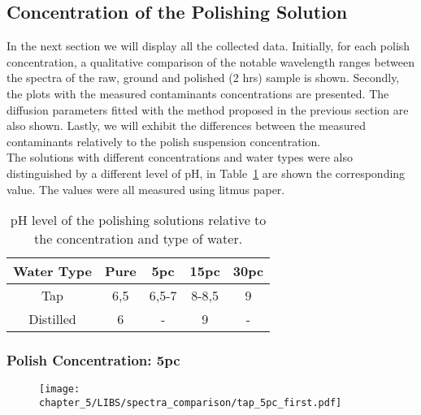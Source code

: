 \subsection{Concentration of the Polishing Solution}
\label{subsec:conc_results}
In the next section we will display all the collected data. Initially, for each polish concentration, a qualitative comparison of the notable wavelength ranges between the spectra of the raw, ground and polished (2 hrs) sample is shown. Secondly, the plots with the measured contaminants concentrations are presented. The diffusion parameters fitted with the method proposed in the previous section are also shown. Lastly, we will exhibit the differences between the measured contaminants relatively to the polish suspension concentration.
\\
The solutions with different concentrations and water types were also distinguished by a different level of pH, in Table~\ref{table:solution_ph} are shown the corresponding value. The values were all measured using litmus paper.

\begin{table}[H]
   \centering
   \begin{tabular}{lclll}
   \hline
   \multicolumn{1}{|c|}{Water Type} & \multicolumn{1}{c|}{Pure} & \multicolumn{1}{c|}{5pc}   & \multicolumn{1}{c|}{15pc}  & \multicolumn{1}{c|}{30pc} \\ \hline
   \multicolumn{1}{|c|}{Tap}        & \multicolumn{1}{c|}{6,5}  & \multicolumn{1}{c|}{6,5-7} & \multicolumn{1}{c|}{8-8,5} & \multicolumn{1}{c|}{9}    \\ \hline
   \multicolumn{1}{|c|}{Distilled}  & \multicolumn{1}{c|}{6}    & \multicolumn{1}{c|}{-}     & \multicolumn{1}{c|}{9}     & \multicolumn{1}{c|}{-}    \\ \hline
   \end{tabular}
   \caption{pH level of the polishing solutions relative to the concentration and type of water.}
        \label{table:solution_ph}
   \end{table}
\subsubsection{Polish Concentration: 5pc}
\label{subsubsec:5pc}

\begin{figure}[H]
    \centering
    \texttt{[image: chapter\_5/LIBS/spectra\_comparison/tap\_5pc\_first.pdf]} 
 \end{figure}

